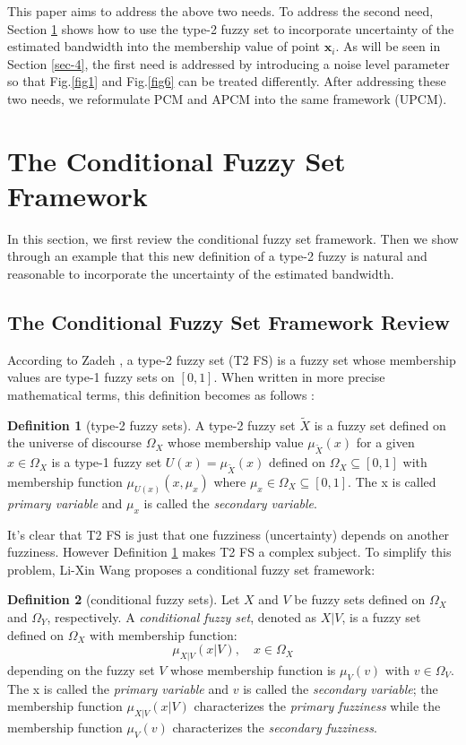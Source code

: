 \documentclass[journal,transmag]{IEEEtran}
\theoremstyle{definition}
\newtheorem{definition}{Definition}
\begin{document}
This paper aims to address the above two needs.
To address the second need, Section \ref{sec-3} shows how to use the type-2 fuzzy set to incorporate uncertainty of the estimated bandwidth into the membership value of point $\mathbf{x}_i$. As will be seen in Section \ref{sec-4}, the first need is addressed by introducing a noise level parameter so that Fig.\ref{fig1} and Fig.\ref{fig6} can be treated differently. After addressing these two needs, we reformulate PCM and APCM into the same framework (UPCM).
\section{The Conditional Fuzzy Set Framework}
\label{sec-3}
In this section, we first review the conditional fuzzy set framework. Then we show through an example that this new definition of a type-2 fuzzy is natural and reasonable to incorporate the uncertainty of the estimated bandwidth.
\subsection{The Conditional Fuzzy Set Framework Review}
\label{sec-3-1}
According to Zadeh \cite{zadeh_concept_1975}, a type-2 fuzzy set (T2 FS) is a fuzzy set whose membership values are type-1 fuzzy sets on $[0,1]$. When written in more precise mathematical terms, this definition becomes as follows \cite{wang_new_2016}:

\begin{definition}[type-2 fuzzy sets]
\label{type2-fs}
A type-2 fuzzy set $\tilde{X}$ is a fuzzy set defined on the universe of discourse $\Omega_X$ whose membership value $\mu_{\tilde{X}}(x)$ for a given $x\in\Omega_X$ is a type-1 fuzzy set  $U(x)=\mu_{\tilde{X}}(x)$ defined on $\Omega_X\subseteq[0,1]$ with membership function $\mu_{U(x)}(x,\mu_x)$ where $\mu_x\in\Omega_X\subseteq[0,1]$. The x is called \emph{primary variable} and $\mu_x$ is called the \emph{secondary variable}.
\end{definition}

It's clear that T2 FS is just that one fuzziness (uncertainty) depends on another fuzziness. However Definition \ref{type2-fs} makes T2 FS a complex subject. To simplify this problem, Li-Xin Wang \cite{wang_new_2016} proposes a conditional fuzzy set framework:

\begin{definition}[conditional fuzzy sets]
\label{conditional-fs}
Let $X$ and $V$ be fuzzy sets defined on $\Omega_X$ and $\Omega_Y$, respectively. A \emph{conditional fuzzy set}, denoted as $X|V$, is a fuzzy set defined on $\Omega_X$ with membership function:
\begin{equation}
\mu_{X|V}(x|V),\quad  x\in\Omega_X
\end{equation}
depending on the fuzzy set $V$ whose membership function is $\mu_V(v)$ with $v\in\Omega_V$. The x is called the \emph{primary variable} and $v$ is called the \emph{secondary variable}; the membership function $\mu_{X|V}(x|V)$ characterizes the \emph{primary fuzziness} while the membership function $\mu_V(v)$ characterizes the \emph{secondary fuzziness}.
\end{definition}
\end{document}
